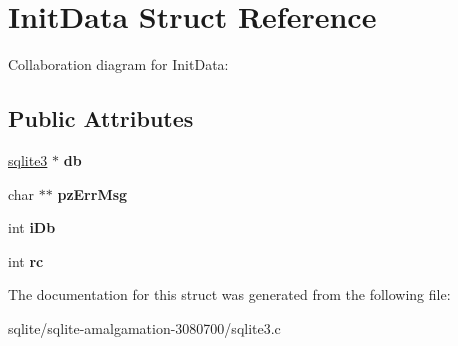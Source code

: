 \hypertarget{struct_init_data}{\section{Init\+Data Struct Reference}
\label{struct_init_data}
}


Collaboration diagram for Init\+Data\+:
\subsection*{Public Attributes}
\begin{DoxyCompactItemize}
\item 
\hypertarget{struct_init_data_adc9e29c56e0392076e92d7f4b29fa272}{\hyperlink{structsqlite3}{sqlite3} $\ast$ {\bfseries db}}\label{struct_init_data_adc9e29c56e0392076e92d7f4b29fa272}

\item 
\hypertarget{struct_init_data_aa8aef34241ec214f038b38932ffe1357}{char $\ast$$\ast$ {\bfseries pz\+Err\+Msg}}\label{struct_init_data_aa8aef34241ec214f038b38932ffe1357}

\item 
\hypertarget{struct_init_data_ad6c7953b49d351cd9fb14e3394010689}{int {\bfseries i\+Db}}\label{struct_init_data_ad6c7953b49d351cd9fb14e3394010689}

\item 
\hypertarget{struct_init_data_a627153a3de2c4d159ae44ebc03961592}{int {\bfseries rc}}\label{struct_init_data_a627153a3de2c4d159ae44ebc03961592}

\end{DoxyCompactItemize}


The documentation for this struct was generated from the following file\+:\begin{DoxyCompactItemize}
\item 
sqlite/sqlite-\/amalgamation-\/3080700/sqlite3.\+c\end{DoxyCompactItemize}
